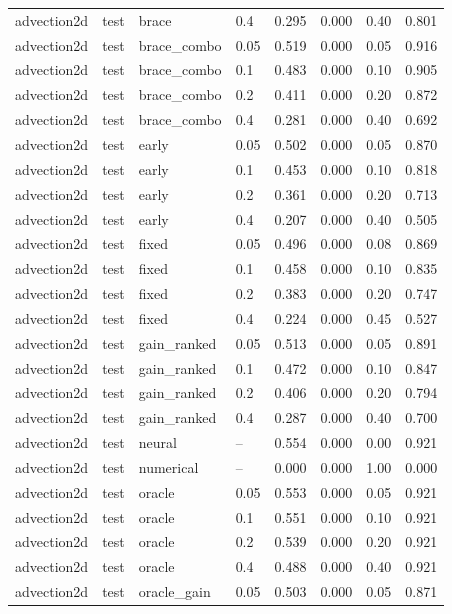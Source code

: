 \begin{tabular}{llllrrrr}
advection2d & test & brace & 0.4 & 0.295 & 0.000 & 0.40 & 0.801 \\
advection2d & test & brace\_combo & 0.05 & 0.519 & 0.000 & 0.05 & 0.916 \\
advection2d & test & brace\_combo & 0.1 & 0.483 & 0.000 & 0.10 & 0.905 \\
advection2d & test & brace\_combo & 0.2 & 0.411 & 0.000 & 0.20 & 0.872 \\
advection2d & test & brace\_combo & 0.4 & 0.281 & 0.000 & 0.40 & 0.692 \\
advection2d & test & early & 0.05 & 0.502 & 0.000 & 0.05 & 0.870 \\
advection2d & test & early & 0.1 & 0.453 & 0.000 & 0.10 & 0.818 \\
advection2d & test & early & 0.2 & 0.361 & 0.000 & 0.20 & 0.713 \\
advection2d & test & early & 0.4 & 0.207 & 0.000 & 0.40 & 0.505 \\
advection2d & test & fixed & 0.05 & 0.496 & 0.000 & 0.08 & 0.869 \\
advection2d & test & fixed & 0.1 & 0.458 & 0.000 & 0.10 & 0.835 \\
advection2d & test & fixed & 0.2 & 0.383 & 0.000 & 0.20 & 0.747 \\
advection2d & test & fixed & 0.4 & 0.224 & 0.000 & 0.45 & 0.527 \\
advection2d & test & gain\_ranked & 0.05 & 0.513 & 0.000 & 0.05 & 0.891 \\
advection2d & test & gain\_ranked & 0.1 & 0.472 & 0.000 & 0.10 & 0.847 \\
advection2d & test & gain\_ranked & 0.2 & 0.406 & 0.000 & 0.20 & 0.794 \\
advection2d & test & gain\_ranked & 0.4 & 0.287 & 0.000 & 0.40 & 0.700 \\
advection2d & test & neural & -- & 0.554 & 0.000 & 0.00 & 0.921 \\
advection2d & test & numerical & -- & 0.000 & 0.000 & 1.00 & 0.000 \\
advection2d & test & oracle & 0.05 & 0.553 & 0.000 & 0.05 & 0.921 \\
advection2d & test & oracle & 0.1 & 0.551 & 0.000 & 0.10 & 0.921 \\
advection2d & test & oracle & 0.2 & 0.539 & 0.000 & 0.20 & 0.921 \\
advection2d & test & oracle & 0.4 & 0.488 & 0.000 & 0.40 & 0.921 \\
advection2d & test & oracle\_gain & 0.05 & 0.503 & 0.000 & 0.05 & 0.871 \\

\end{tabular}
